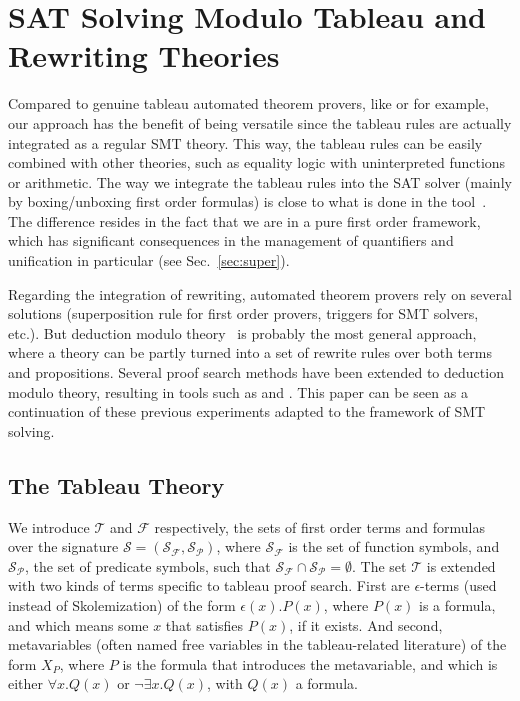 
\section{SAT Solving Modulo Tableau and Rewriting Theories}
\label{sec:smt}

Compared to genuine tableau automated theorem provers, like \princess{} or
\zenon{} for example, our approach has the benefit of being versatile since the
tableau rules are actually integrated as a regular SMT theory. This way, the
tableau rules can be easily combined with other theories, such as equality logic
with uninterpreted functions or arithmetic. The way we integrate the tableau
rules into the SAT solver (mainly by boxing/unboxing first order formulas) is
close to what is done in the \satallax{} tool~\cite{CEB12}. The difference
resides in the fact that we are in a pure first order framework, which has
significant consequences in the management of quantifiers and unification in
particular (see Sec.~\ref{sec:super}).

Regarding the integration of rewriting, automated theorem provers rely on
several solutions (superposition rule for first order provers, triggers for SMT
solvers, etc.). But deduction modulo theory~\cite{DA03} is probably the most
general approach, where a theory can be partly turned into a set of rewrite
rules over both terms and propositions. Several proof search methods have been
extended to deduction modulo theory, resulting in tools such as \iproverm{} and
\zenm{}. This paper can be seen as a continuation of these previous experiments
adapted to the framework of SMT solving.

\subsection{The Tableau Theory}
\label{sec:tab}

We introduce $\mathcal{T}$ and $\mathcal{F}$ respectively,
the sets of first order terms and formulas over the signature
$\mathcal{S}=(\mathcal{S}_\mathcal{F},\mathcal{S}_\mathcal{P})$, where
$\mathcal{S}_\mathcal{F}$ is the set of function symbols, and
$\mathcal{S}_\mathcal{P}$, the set of predicate symbols, such that
$\mathcal{S}_\mathcal{F}\cap\mathcal{S}_\mathcal{P}=\emptyset$. The set
$\mathcal{T}$ is extended with two kinds of terms specific to tableau proof
search. First are $\epsilon{}$-terms (used instead of Skolemization) of the form
$\epsilon(x).P(x)$, where $P(x)$ is a formula, and which means some $x$ that
satisfies $P(x)$, if it exists. And second, metavariables (often named free variables in
the tableau-related literature) of the form $X_P$, where $P$ is the formula that
introduces the metavariable, and which is either $\forall{}x.Q(x)$ or
$\neg\exists{}x.Q(x)$, with $Q(x)$ a formula.

